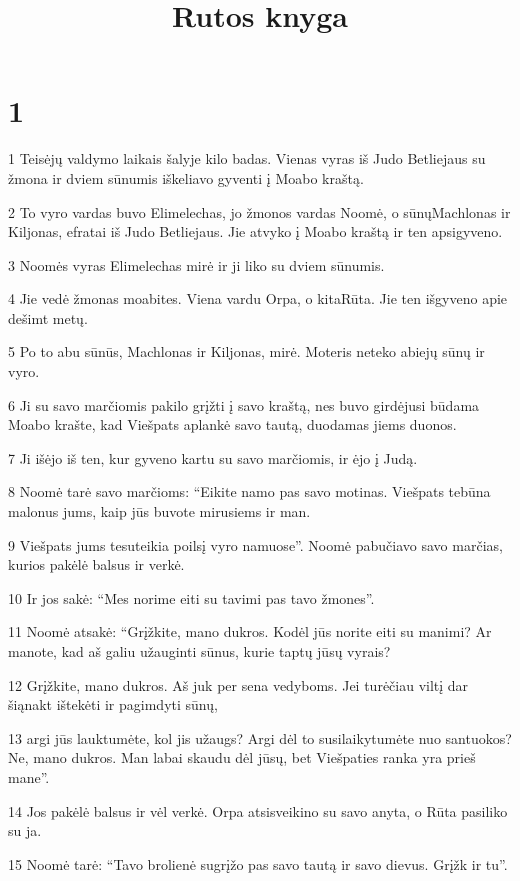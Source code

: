 

\title{Rutos knyga}

\chapter{1}


\par 1 Teisėjų valdymo laikais šalyje kilo badas. Vienas vyras iš Judo Betliejaus su žmona ir dviem sūnumis iškeliavo gyventi į Moabo kraštą. 
\par 2 To vyro vardas buvo Elimelechas, jo žmonos vardas Noomė, o sūnų­Machlonas ir Kiljonas, efratai iš Judo Betliejaus. Jie atvyko į Moabo kraštą ir ten apsigyveno. 
\par 3 Noomės vyras Elimelechas mirė ir ji liko su dviem sūnumis. 
\par 4 Jie vedė žmonas moabites. Viena vardu Orpa, o kita­Rūta. Jie ten išgyveno apie dešimt metų. 
\par 5 Po to abu sūnūs, Machlonas ir Kiljonas, mirė. Moteris neteko abiejų sūnų ir vyro. 
\par 6 Ji su savo marčiomis pakilo grįžti į savo kraštą, nes buvo girdėjusi būdama Moabo krašte, kad Viešpats aplankė savo tautą, duodamas jiems duonos. 
\par 7 Ji išėjo iš ten, kur gyveno kartu su savo marčiomis, ir ėjo į Judą. 
\par 8 Noomė tarė savo marčioms: “Eikite namo pas savo motinas. Viešpats tebūna malonus jums, kaip jūs buvote mirusiems ir man. 
\par 9 Viešpats jums tesuteikia poilsį vyro namuose”. Noomė pabučiavo savo marčias, kurios pakėlė balsus ir verkė. 
\par 10 Ir jos sakė: “Mes norime eiti su tavimi pas tavo žmones”. 
\par 11 Noomė atsakė: “Grįžkite, mano dukros. Kodėl jūs norite eiti su manimi? Ar manote, kad aš galiu užauginti sūnus, kurie taptų jūsų vyrais? 
\par 12 Grįžkite, mano dukros. Aš juk per sena vedyboms. Jei turėčiau viltį dar šiąnakt ištekėti ir pagimdyti sūnų, 
\par 13 argi jūs lauktumėte, kol jis užaugs? Argi dėl to susilaikytumėte nuo santuokos? Ne, mano dukros. Man labai skaudu dėl jūsų, bet Viešpaties ranka yra prieš mane”. 
\par 14 Jos pakėlė balsus ir vėl verkė. Orpa atsisveikino su savo anyta, o Rūta pasiliko su ja. 
\par 15 Noomė tarė: “Tavo brolienė sugrįžo pas savo tautą ir savo dievus. Grįžk ir tu”. 
